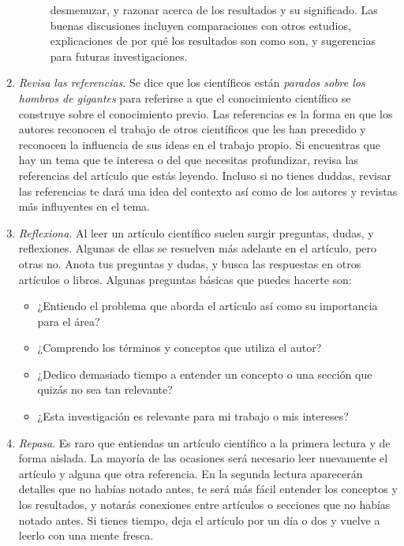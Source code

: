 \begin{enumerate}
\begin{description}
                  desmenuzar, y razonar acerca de los resultados y su
                  significado.
                  Las buenas discusiones incluyen comparaciones con otros
                  estudios, explicaciones de por qué los resultados son como
                  son, y sugerencias para futuras investigaciones.
          \end{description}
    \item \emph{Revisa las referencias}. Se dice que los científicos están
          \emph{parados sobre los hombros de gigantes} para referirse a que el
          conocimiento científico se construye sobre el conocimiento previo.
          Las referencias es la forma en que los autores reconocen el trabajo de
          otros científicos que les han precedido y reconocen la influencia de
          sus ideas en el trabajo propio.
          Si encuentras que hay un tema que te interesa o del que necesitas
          profundizar, revisa las referencias del artículo que estás leyendo.
          Incluso si no tienes duddas, revisar las referencias te dará una idea
          del contexto así como de los autores y revistas más influyentes en el
          tema.
    \item \emph{Reflexiona}. Al leer un artículo científico suelen surgir
          preguntas, dudas, y reflexiones.
          Algunas de ellas se resuelven más adelante en el artículo, pero otras
          no.
          Anota tus preguntas y dudas, y busca las respuestas en otros artículos
          o libros.
          Algunas preguntas básicas que puedes hacerte son:
          \begin{itemize}
              \item ¿Entiendo el problema que aborda el artículo así como su
                    importancia para el área?
              \item ¿Comprendo los términos y conceptos que utiliza el autor?
              \item ¿Dedico demasiado tiempo a entender un concepto o una
                    sección que quizás no sea tan relevante?
              \item ¿Esta investigación es relevante para mi trabajo o mis
                    intereses?
          \end{itemize}
    \item \emph{Repasa}. Es raro que entiendas un artículo científico a la
          primera lectura y de forma aislada.
          La mayoría de las ocasiones será necesario leer nuevamente el artículo
          y alguna que otra referencia.
          En la segunda lectura aparecerán detalles que no habías notado antes,
          te será más fácil entender los conceptos y los resultados, y notarás
          conexiones entre artículos o secciones que no habías notado antes.
          Si tienes tiempo, deja el artículo por un día o dos y vuelve a leerlo
          con una mente fresca.
\end{enumerate}

